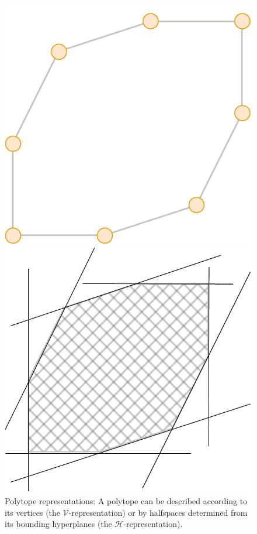 \begin{figure}[!htb]
    \captionsetup{justification=centering}
    \begin{minipage}{0.49\linewidth}
        \centering
        \includegraphics[trim={0 0 0 0},clip, width=0.6\linewidth]{img/chapter_2/zonotope_vertices.pdf}
    \end{minipage}
    \hfill
    \begin{minipage}{0.49\linewidth}
        \centering
        \includegraphics[trim={0 0 0 0},clip,width=0.75\linewidth]{img/chapter_2/zonotope_hyperplanes.pdf}
    \end{minipage}
    \caption{Polytope representations: A polytope can be described according to its vertices (the $\mathcal{V}$-representation) or by halfspaces determined from its bounding hyperplanes (the $\mathcal{H}$-representation).}
    \label{fig:polytope_v_and_h_rep}
\end{figure}

